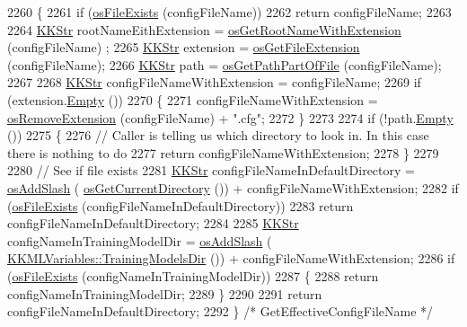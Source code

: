 \begin{DoxyCode}
2260 \{
2261   \textcolor{keywordflow}{if}  (\hyperlink{namespace_k_k_b_aba5c7fcb492dea01f2115c492ff65d83}{osFileExists} (configFileName))
2262     \textcolor{keywordflow}{return}  configFileName;
2263 
2264   \hyperlink{class_k_k_b_1_1_k_k_str}{KKStr}  rootNameEithExtension = \hyperlink{namespace_k_k_b_a04d728a8cb494d051660f5da81bd344e}{osGetRootNameWithExtension} (configFileName)
      ;
2265   \hyperlink{class_k_k_b_1_1_k_k_str}{KKStr}  extension = \hyperlink{namespace_k_k_b_ac66b0fee156008ea19ba4a0068378743}{osGetFileExtension} (configFileName);
2266   \hyperlink{class_k_k_b_1_1_k_k_str}{KKStr}  path = \hyperlink{namespace_k_k_b_a38ede02e5dd6c77a3171427f86fac02f}{osGetPathPartOfFile} (configFileName);
2267 
2268   \hyperlink{class_k_k_b_1_1_k_k_str}{KKStr}  configFileNameWithExtension = configFileName;
2269   \textcolor{keywordflow}{if}  (extension.\hyperlink{class_k_k_b_1_1_k_k_str_ac69942f73fffd672ec2a6e1c410afdb6}{Empty} ())
2270   \{
2271     configFileNameWithExtension = \hyperlink{namespace_k_k_b_a13b1a6f4e074969602dbe4bf9022a9c6}{osRemoveExtension} (configFileName) + \textcolor{stringliteral}{".cfg"};
2272   \}
2273 
2274   \textcolor{keywordflow}{if}  (!path.\hyperlink{class_k_k_b_1_1_k_k_str_ac69942f73fffd672ec2a6e1c410afdb6}{Empty} ())
2275   \{
2276     \textcolor{comment}{// Caller is telling us which directory to look in.  In this case there is nothing to do}
2277     \textcolor{keywordflow}{return} configFileNameWithExtension;
2278   \}
2279 
2280   \textcolor{comment}{// See if file exists}
2281   \hyperlink{class_k_k_b_1_1_k_k_str}{KKStr}  configFileNameInDefaultDirectory = \hyperlink{namespace_k_k_b_aa0d40119b911df4283399a1724cab1ef}{osAddSlash} (
      \hyperlink{namespace_k_k_b_aed20261d2361f9db946aed1c1a1a18ac}{osGetCurrentDirectory} ()) + configFileNameWithExtension;
2282   \textcolor{keywordflow}{if}  (\hyperlink{namespace_k_k_b_aba5c7fcb492dea01f2115c492ff65d83}{osFileExists} (configFileNameInDefaultDirectory))
2283     \textcolor{keywordflow}{return}  configFileNameInDefaultDirectory;
2284 
2285   \hyperlink{class_k_k_b_1_1_k_k_str}{KKStr}  configNameInTrainingModelDir = \hyperlink{namespace_k_k_b_aa0d40119b911df4283399a1724cab1ef}{osAddSlash} (
      \hyperlink{class_k_k_m_l_l_1_1_k_k_m_l_variables_a5d979a176f5db194a4d9d96634e21ce0}{KKMLVariables::TrainingModelsDir} ()) + configFileNameWithExtension;
2286   \textcolor{keywordflow}{if}  (\hyperlink{namespace_k_k_b_aba5c7fcb492dea01f2115c492ff65d83}{osFileExists} (configNameInTrainingModelDir))
2287   \{
2288     \textcolor{keywordflow}{return}  configNameInTrainingModelDir;
2289   \}
2290 
2291   \textcolor{keywordflow}{return}  configFileNameInDefaultDirectory;
2292 \}  \textcolor{comment}{/* GetEffectiveConfigFileName */}
\end{DoxyCode}
